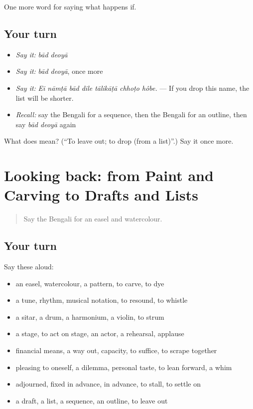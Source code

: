 \begin{grammarlens}[title={What you've built}]
One more word for saying what happens if.
\end{grammarlens}

\subsection*{Your turn}
\begin{itemize}
\raggedright
  \item \emph{Say it:} \emph{bād deoyā}
  \item \emph{Say it:} \emph{bād deoyā}, once more
  \item \emph{Say it:} \emph{Ei nāmṭā bād dile tālikāṭā chhoṭo hôbe.} — If you drop this name, the list will be shorter.
  \item \emph{Recall:} say the Bengali for a sequence, then the Bengali for an outline, then say \emph{bād deoyā} again
\end{itemize}

\begin{tcolorbox}[breakable,colback=teal!4,colframe=teal!35!black,title={Before you move on}]
What does   mean? (\textquotedblleft{}To leave out; to drop (from a list)\textquotedblright{}.) Say it once more.
\end{tcolorbox}
\section[(dialogue)]{Looking back: from Paint and Carving to Drafts and Lists}

\label{lesson:BN-R531-review-524-531}



\begin{quote}
Say the Bengali for an easel and watercolour.
\end{quote}

\subsection*{Your turn}
Say these aloud:

\begin{itemize}
\raggedright
  \item an easel, watercolour, a pattern, to carve, to dye
  \item a tune, rhythm, musical notation, to resound, to whistle
  \item a sitar, a drum, a harmonium, a violin, to strum
  \item a stage, to act on stage, an actor, a rehearsal, applause
  \item financial means, a way out, capacity, to suffice, to scrape together
  \item pleasing to oneself, a dilemma, personal taste, to lean forward, a whim
  \item adjourned, fixed in advance, in advance, to stall, to settle on
  \item a draft, a list, a sequence, an outline, to leave out
\end{itemize}

